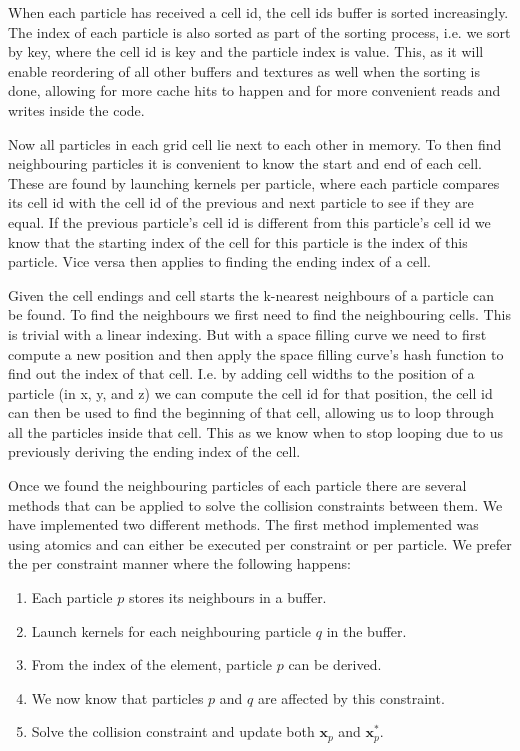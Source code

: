 When each particle has received a cell id, the cell ids buffer is sorted
increasingly. The index of each particle is also sorted as part of the sorting
process, i.e. we sort by key, where the cell id is key and the particle index
is value. This, as it will enable reordering of all other buffers and textures
as well when the sorting is done, allowing for more cache hits to happen and
for more convenient reads and writes inside the code.

Now all particles in each grid cell lie next to each other in memory. To then
find neighbouring particles it is convenient to know the start and end of each
cell. These are found by launching kernels per particle, where each particle
compares its cell id with the cell id of the previous and next particle to see
if they are equal. If the previous particle's cell id is different from this
particle's cell id we know that the starting index of the cell for this
particle is the index of this particle. Vice versa then applies to finding the
ending index of a cell.

Given the cell endings and cell starts the k-nearest neighbours of a particle
can be found. To find the neighbours we first need to find the neighbouring
cells. This is trivial with a linear indexing. But with a space filling curve
we need to first compute a new position and then apply the space filling
curve's hash function to find out the index of that cell. I.e. by adding cell
widths to the position of a particle (in x, y, and z) we can compute the cell
id for that position, the cell id can then be used to find the beginning of
that cell, allowing us to loop through all the particles inside that cell. This
as we know when to stop looping due to us previously deriving the ending index
of the cell.

Once we found the neighbouring particles of each particle there are several
methods that can be applied to solve the collision constraints between them. We
have implemented two different methods. The first method implemented was using
atomics and can either be executed per constraint or per particle. We prefer
the per constraint manner where the following happens:

\begin{enumerate}
\item Each particle $p$ stores its neighbours in a buffer.
\item Launch kernels for each neighbouring particle $q$ in the buffer.
\item From the index of the element, particle $p$ can be derived.
\item We now know that particles $p$ and $q$ are affected by this constraint.
\item Solve the collision constraint and update both $\mathbf{x}_{p}$ and $\mathbf{x}_{p}^{*}$.
\end{enumerate}

